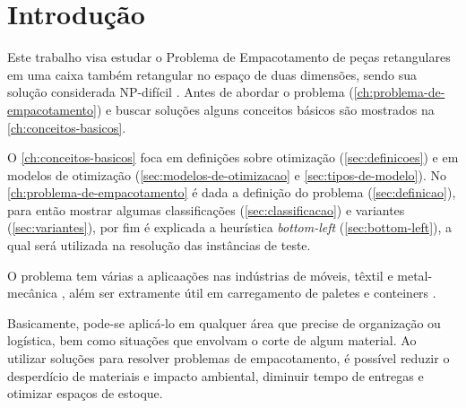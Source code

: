 \chapter{Introdução}\label{ch:introducao}

Este trabalho visa estudar o Problema de Empacotamento de peças retangulares em uma caixa também retangular no espaço de duas dimensões, sendo sua solução considerada NP-difícil \cite{2DPackLib}.
Antes de abordar o problema (\autoref{ch:problema-de-empacotamento}) e buscar soluções alguns conceitos básicos são mostrados na \autoref{ch:conceitos-basicos}.

O \autoref{ch:conceitos-basicos} foca em definições sobre otimização (\autoref{sec:definicoes}) e em modelos de otimização (\autoref{sec:modelos-de-otimizacao} e \autoref{sec:tipos-de-modelo}).
No \autoref{ch:problema-de-empacotamento} é dada a definição do problema (\autoref{sec:definicao}), para então mostrar algumas classificações (\autoref{sec:classificacao}) e variantes (\autoref{sec:variantes}), por fim é explicada a heurística \textit{bottom-left} (\autoref{sec:bottom-left}), a qual será utilizada na resolução das instâncias de teste.

O problema tem várias a aplicaações nas indústrias de móveis, têxtil e metal-mecânica \cite{queiroz2022estudo, cavali2004problemas, belluzzo2005otimizacao}, além ser extramente útil em carregamento de paletes e conteiners \cite{morabito1992abordagem}.

Basicamente, pode-se aplicá-lo em qualquer área que precise de organização ou logística, bem como situações que envolvam o corte de algum material.
Ao utilizar soluções para resolver problemas de empacotamento, é possível reduzir o desperdício de materiais e impacto ambiental, diminuir tempo de entregas e otimizar espaços de estoque.


